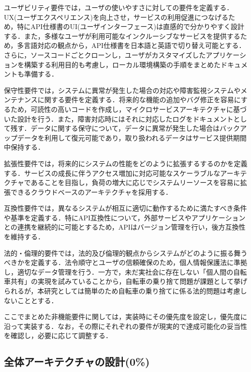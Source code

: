           \par ユーザビリティ要件では，ユーザの使いやすさに対しての要件を定義する．UX(ユーザエクスペリエンス)を向上させ，サービスの利用促進につなげるため，特にAPI仕様書のUI(ユーザインターフェース)は直感的で分かりやすく設計する．また，多様なユーザが利用可能なインクルーシブなサービスを提供するため，多言語対応の観点から，API仕様書を日本語と英語で切り替え可能とする．さらに，ソースコードごとクローンし，ユーザがカスタマイズしたアプリケーションを構築する利用目的も考慮し，ローカル環境構築の手順をまとめたドキュメントも準備する．
          \par 保守性要件では，システムに異常が発生した場合の対応や障害監視システムやメンテナンスに関する要件を定義する．将来的な機能の追加やバグ修正を容易にするため，可読性の高いコードを作成し，マイクロサービスアーキテクチャに基づいた設計を行う．また，障害対応時にはそれに対応したログをドキュメントとして残す．データに関する保守について，データに異常が発生した場合はバックアップデータを利用して復元可能であり，取り扱われるデータはサービス提供期間中保持する．
          \par 拡張性要件では，将来的にシステムの性能をどのように拡張するするのかを定義する．サービスの成長に伴うアクセス増加に対応可能なスケーラブルなアーキテクチャであることを目指し，負荷の増大に応じでシステムリーソースを容易に拡張できるクラウドベースのアーキテクチャを採用する．
          \par 互換性要件では，異なるシステムが相互に適切に動作するために満たすべき条件や基準を定義する．特にAPI互換性について，外部サービスやアプリケーションとの連携を継続的に可能とするため，APIはバージョン管理を行い，後方互換性を維持する．
          \par 法的・倫理的要件では，法的及び倫理的観点からシステムがどのように振る舞うべきかを定義する．法令順守とユーザの信頼確保のため，個人情報保護法に準拠し，適切なデータ管理を行う．一方で，未だ実社会に存在しない「個人間の自転車共有」の実現を試みていることから，自転車の乗り捨て問題が課題として挙げられるが，本研究としては簡単のため自転車の乗り捨てに係る法的問題は考慮しないこととする．
          \par ここでまとめた非機能要件に関しては，実装時にその優先度を設定し，優先度に沿って実装する．なお，その際にそれぞれの要件が現実的で達成可能化の妥当性を確認し，必要に応じて調整する．
      
  \subsection{全体アーキテクチャの設計(0\%)}
    \label{sec:全体アーキテクチャの設計}
      \par
      
